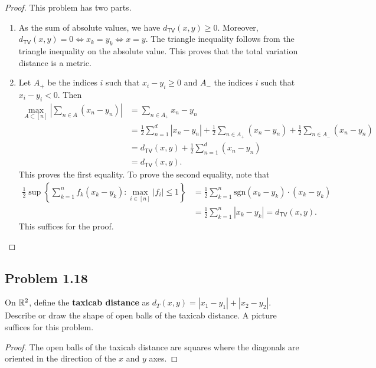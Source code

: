\documentclass[12pt]{article}
\begin{document}
\begin{proof}
	This problem has two parts. 
	\begin{enumerate}[label = (\alph*)]
		\item As the sum of absolute values, we have $d_{\mathsf{TV}}(x, y) \geq 0$. Moreover, $d_{\mathsf{TV}}(x, y) = 0 \iff x_k = y_k \iff x = y$. The triangle inequality follows from the triangle inequality on the absolute value. This proves that the total variation distance is a metric. 

		\item Let $A_+$ be the indices $i$ such that $x_i - y_i \geq 0$ and $A_-$ the indices $i$ such that $x_i - y_i < 0$. Then 
		\begin{align*}
			\max_{A \subset [n]} \left | \sum_{n \in A} (x_n - y_n) \right | & = \sum_{n \in A_+} x_n - y_n \\
			& = \frac{1}{2} \sum_{n = 1}^d |x_n - y_n| + \frac{1}{2} \sum_{n \in A_+} (x_n - y_n) + \frac{1}{2}\sum_{n \in A_-} (x_n - y_n) \\
			& = d_{\mathsf{TV}}(x, y) + \frac{1}{2} \sum_{n = 1}^d (x_n - y_n) \\
			& = d_{\mathsf{TV}}(x, y). 
		\end{align*}
		This proves the first equality. To prove the second equality, note that 
		\begin{align*}
			\frac{1}{2} \sup \left \{ \sum_{k = 1}^n f_k (x_k - y_k) : \max_{i \in [n]} |f_i| \leq 1 \right \} & = \frac{1}{2} \sum_{k = 1}^n \text{sgn}(x_k - y_k) \cdot (x_k - y_k) \\
			& = \frac{1}{2} \sum_{k = 1}^n |x_k - y_k| = d_{\mathsf{TV}}(x, y). 
		\end{align*}
		This suffices for the proof. 
	\end{enumerate}
\end{proof}

\newpage 

\subsection{Problem 1.18}

\begin{problem}
	On $\mathbb{R}^2$, define the \textbf{taxicab distance} as $d_T(x, y) = |x_1 - y_1| + |x_2 - y_2|$. Describe or draw the shape of open balls of the taxicab distance. A picture suffices for this problem. 
\end{problem}

\begin{proof}
	The open balls of the taxicab distance are squares where the diagonals are oriented in the direction of the $x$ and $y$ axes. 
\end{proof}
\end{document}
